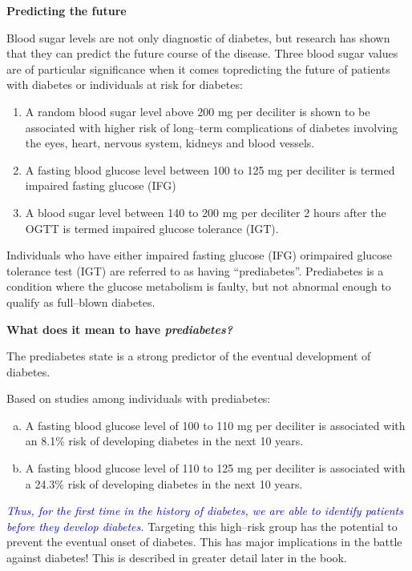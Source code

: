 \noindent
\textbf{Predicting the future}

Blood sugar levels are not only diagnostic of diabetes, but research has shown that they can predict the future course of the disease. Three blood sugar values are of particular significance when it comes to\break predicting the future of patients with diabetes or individuals at risk for diabetes:

\begin{enumerate}
\itemsep=0pt
\item A random blood sugar level above 200 mg per deciliter is shown to be associated with higher risk of long–term complications of diabetes involving the eyes, heart, nervous system, kidneys and blood vessels.
 \item A fasting blood glucose level between 100 to 125 mg per deciliter is termed impaired fasting glucose (IFG)
 \item A blood sugar level between 140 to 200 mg per deciliter 2 hours after the OGTT is termed impaired glucose tolerance (IGT).
 \end{enumerate}
 \vspace{-\topsep}

Individuals who have either impaired fasting glucose (IFG) or\break impaired glucose tolerance test (IGT) are referred to as having “prediabetes”. Prediabetes is a condition where the glucose metabolism is faulty, but not abnormal enough to qualify as full–blown diabetes.

\noindent
\textbf{What does it mean to have \textit{prediabetes?}}

The prediabetes state is a strong predictor of the eventual deve\-lopment of diabetes.

Based on studies among individuals with prediabetes:

\begin{enumerate}[a)]
\itemsep=0pt
\item A fasting blood glucose level of 100 to 110 mg per deciliter is asso\-ciated with an 8.1\% risk of developing diabetes in the next 10 years.
 \item A fasting blood glucose level of 110 to 125 mg per deciliter is associated with a 24.3\% risk of developing diabetes in the next 10 years.
 \end{enumerate}

\textcolor{blue}{\textit{Thus, for the first time in the history of diabetes, we are able to identify patients before they develop diabetes.}} Targeting this high–risk group has the potential to prevent the eventual onset of diabetes. This has major implications in the battle against diabetes! This is described in greater detail later in the book.

